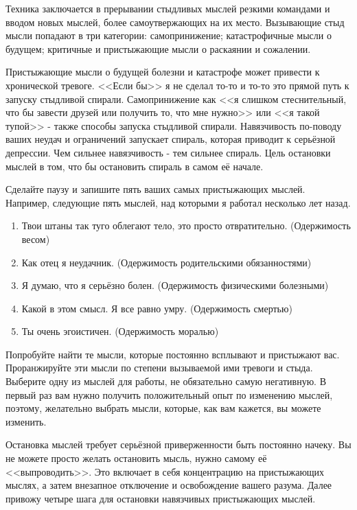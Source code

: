 \documentclass[10pt, fleqn]{article}
\begin{document}
Техника заключается в прерывании стыдливых мыслей резкими командами и вводом новых мыслей, более самоутвержающих на их место. Вызывающие стыд мысли попадают в три категории: самопринижение; катастрофичные мысли о будущем; критичные и пристыжающие мысли о раскаянии и сожалении.

Пристыжающие мысли о будущей болезни и катастрофе может привести к хронической тревоге. <<Если бы>> я не сделал то-то и то-то это прямой путь к запуску стыдливой спирали. Самопринижение как <<я слишком стеснительный, что бы завести друзей или получить то, что мне нужно>> или <<я такой тупой>> - также способы запуска стыдливой спирали. Навязчивость по-поводу ваших неудач и ограничений запускает спираль, которая приводит к серьёзной депрессии. Чем сильнее навязчивость - тем сильнее спираль. Цель остановки мыслей в том, что бы остановить спираль в самом её начале.

Сделайте паузу и запишите пять ваших самых пристыжающих мыслей. Например, следующие пять мыслей, над которыми я работал несколько лет назад.

\begin{enumerate}
\item Твои штаны так туго облегают тело, это просто отвратительно. (Одержимость весом)
\item Как отец я неудачник. (Одержимость родительскими обязанностями)
\item Я думаю, что я серьёзно болен. (Одержимость физическими болезными)
\item Какой в этом смысл. Я все равно умру. (Одержимость смертью)
\item Ты очень эгоистичен. (Одержимость моралью)
\end{enumerate}

Попробуйте найти те мысли, которые постоянно всплывают и пристыжают вас. Проранжируйте эти мысли по степени вызываемой ими тревоги и стыда. Выберите одну из мыслей для работы, не обязательно самую негативную. В первый раз вам нужно получить положительный опыт по изменению мыслей, поэтому, желательно выбрать мысли, которые, как вам кажется, вы можете изменить.

Остановка мыслей требует серьёзной приверженности быть постоянно начеку. Вы не можете просто желать остановить мысль, нужно самому её <<выпроводить>>. Это включает в себя концентрацию на пристыжающих мыслях, а затем внезапное отключение и освобождение вашего разума. Далее привожу четыре шага для остановки навязчивых пристыжающих мыслей.

\end{document}
